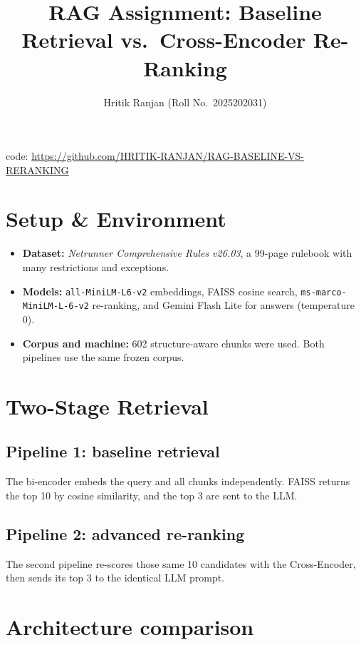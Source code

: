 \documentclass[10pt,a4paper]{article}
\title{RAG Assignment: Baseline Retrieval vs.\ Cross-Encoder Re-Ranking}
\author{Hritik Ranjan \quad (Roll No.\ 2025202031)}
\newcommand{\code}[1]{\texttt{#1}}
\begin{document}
\vspace*{-1.2cm}
{\let\newpage\relax\maketitle}
\vspace{-0.6cm}

\noindent code: \href{https://github.com/HRITIK-RANJAN/RAG-BASELINE-VS-RERANKING}{https://github.com/HRITIK-RANJAN/RAG-BASELINE-VS-RERANKING}

\section*{Setup \& Environment}
\begin{itemize}
  \item \textbf{Dataset:} \emph{Netrunner Comprehensive Rules v26.03}, a 99-page rulebook with many restrictions and exceptions.
  \item \textbf{Models:} \code{all-MiniLM-L6-v2} embeddings, FAISS cosine search, \code{ms-marco-MiniLM-L-6-v2} re-ranking, and Gemini Flash Lite for answers (temperature 0).
  \item \textbf{Corpus and machine:} 602 structure-aware chunks were used. Both pipelines use the same frozen corpus.
\end{itemize}

\section{Two-Stage Retrieval}

\subsection{Pipeline 1: baseline retrieval}
The bi-encoder embeds the query and all chunks independently. FAISS returns the top 10 by cosine similarity, and the top 3 are sent to the LLM.

\subsection{Pipeline 2: advanced re-ranking}
The second pipeline re-scores those same 10 candidates with the Cross-Encoder, then sends its top 3 to the identical LLM prompt.

\section{Architecture comparison}
\end{document}
